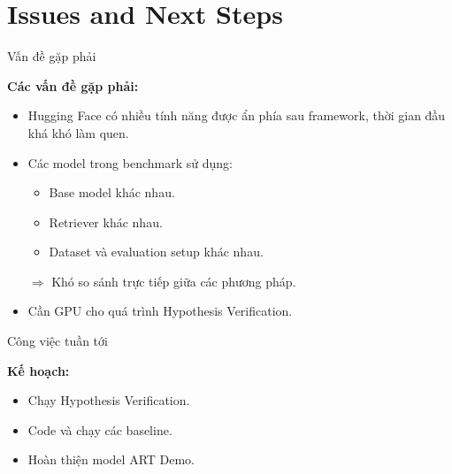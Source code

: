 
\section{Issues and Next Steps}

\begin{frame}{Vấn đề gặp phải}

\textbf{Các vấn đề gặp phải:}

\begin{itemize}
    \item Hugging Face có nhiều tính năng được ẩn phía sau framework, thời gian đầu khá khó làm quen.
    
    \item Các model trong benchmark sử dụng:
    \begin{itemize}
        \item Base model khác nhau.
        \item Retriever khác nhau.
        \item Dataset và evaluation setup khác nhau.
    \end{itemize}
    
    $\Rightarrow$ Khó so sánh trực tiếp giữa các phương pháp.
    
    \item Cần GPU cho quá trình Hypothesis Verification.
\end{itemize}

\end{frame}



\begin{frame}{Công việc tuần tới}

\textbf{Kế hoạch:}

\begin{itemize}
    \item Chạy Hypothesis Verification.
    
    \item Code và chạy các baseline.
    
    \item Hoàn thiện model ART Demo.
\end{itemize}

\end{frame}